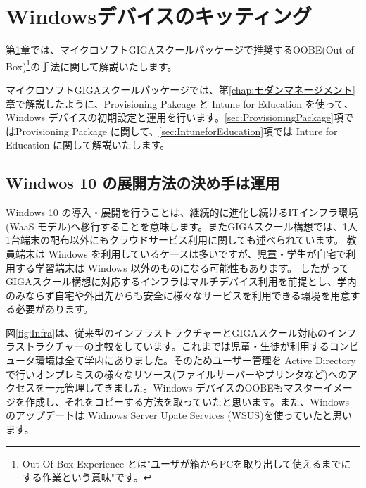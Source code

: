 \onecolumn

\chapter{Windowsデバイスのキッティング}
\label{chap:Windowsデバイスのキッティング}


第\ref{chap:Windowsデバイスのキッティング}章では、マイクロソフトGIGAスクールパッケージで推奨するOOBE(Out of Box)\footnote{Out-Of-Box Experience とは"ユーザが箱からPCを取り出して使えるまでにする作業という意味"です。}の手法に関して解説いたします。

マイクロソフトGIGAスクールパッケージでは、第\ref{chap:モダンマネージメント}章で解説したように、Provisioning Pakcage と Intune for Education を使って、Windows デバイスの初期設定と運用を行います。\ref{sec:ProvisioningPackage}項ではProvisioning Package に関して、\ref{sec:IntuneforEducation}項では Inture for Education に関して解説いたします。

\section{Windwos 10 の展開方法の決め手は運用}
\label{sec:展開の決め手は運用}

Windows 10 の導入・展開を行うことは、継続的に進化し続けるITインフラ環境 (WaaS モデル)へ移行することを意味します。またGIGAスクール構想では、1人1台端末の配布以外にもクラウドサービス利用に関しても述べられています。 教員端末は Windows を利用しているケースは多いですが、児童・学生が自宅で利用する学習端末は Windows 以外のものになる可能性もあります。 したがってGIGAスクール構想に対応するインフラはマルチデバイス利用を前提とし、学内のみならず自宅や外出先からも安全に様々なサービスを利用できる環境を用意する必要があります。

図\ref{fig:Infra}は、従来型のインフラストラクチャーとGIGAスクール対応のインフラストラクチャーの比較をしています。これまでは児童・生徒が利用するコンピュータ環境は全て学内にありました。そのためユーザー管理を Active Directory で行いオンプレミスの様々なリソース(ファイルサーバーやプリンタなど)へのアクセスを一元管理してきました。Windows デバイスのOOBEもマスターイメージを作成し、それをコピーする方法を取っていたと思います。また、Windows のアップデートは Widnows Server Upate Services (WSUS)を使っていたと思います。

